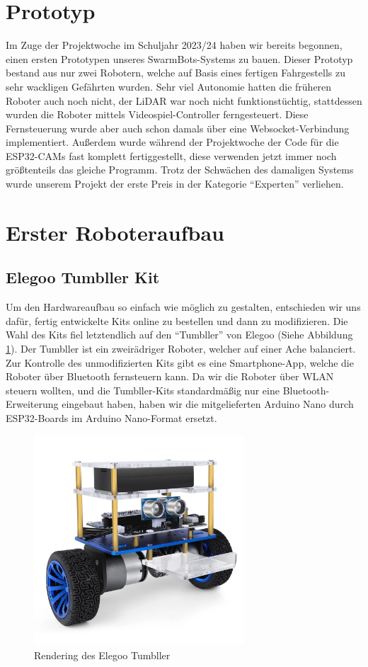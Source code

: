 \documentclass[12pt]{article}
\begin{document}
	\section{Prototyp}
	Im Zuge der Projektwoche im Schuljahr 2023/24 haben wir bereits begonnen,
	einen ersten Prototypen unseres SwarmBots-Systems zu bauen.
	Dieser Prototyp bestand aus nur zwei Robotern,
	welche auf Basis eines fertigen Fahrgestells zu sehr wackligen Gefährten wurden.
	Sehr viel Autonomie hatten die früheren Roboter auch noch nicht,
	der LiDAR war noch nicht funktionstüchtig,
	stattdessen wurden die Roboter mittels Videospiel-Controller ferngesteuert.
	Diese Fernsteuerung wurde aber auch schon damals über eine Websocket-Verbindung implementiert.
	Außerdem wurde während der Projektwoche der Code für die ESP32-CAMs fast komplett fertiggestellt,
	diese verwenden jetzt immer noch größtenteils das gleiche Programm.
	Trotz der Schwächen des damaligen Systems wurde unserem Projekt
	der erste Preis in der Kategorie ``Experten'' verliehen.
	\section{Erster Roboteraufbau}
	\subsection{Elegoo Tumbller Kit}
	Um den Hardwareaufbau so einfach wie möglich zu gestalten,
	entschieden wir uns dafür,
	fertig entwickelte Kits online zu bestellen und dann zu modifizieren.
	Die Wahl des Kits fiel letztendlich auf den ``Tumbller'' von Elegoo (Siehe Abbildung \ref{fig:elegoo_tumbller}).
	Der Tumbller ist ein zweirädriger Roboter, welcher auf einer Ache balanciert.
	Zur Kontrolle des unmodifizierten Kits gibt es eine Smartphone-App,
	welche die Roboter über Bluetooth fernsteuern kann.
	Da wir die Roboter über WLAN steuern wollten, 
	und die Tumbller-Kits standardmäßig nur eine Bluetooth-Erweiterung eingebaut haben,
	haben wir die mitgelieferten Arduino Nano durch ESP32-Boards im Arduino Nano-Format ersetzt.
	\begin{figure}[H]
		\includegraphics[width=0.7\textwidth, center]{img/elegoo_tumbller.png}
		\caption{Rendering des Elegoo Tumbller}
		\label{fig:elegoo_tumbller}
	\end{figure}
\end{document}

